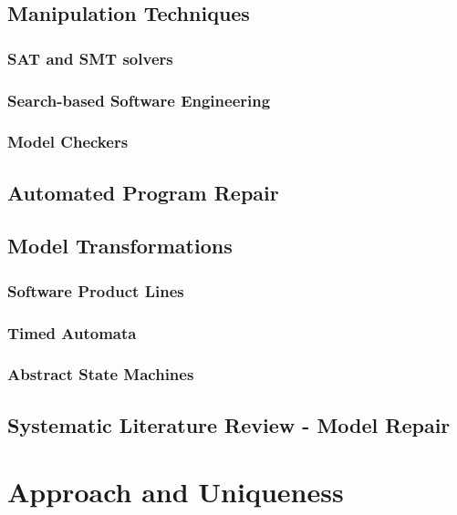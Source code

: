 \documentclass[
11pt, %
oneside, %
english, %
singlespacing, %
headsepline, %
]{MastersDoctoralThesis} %
\theoremstyle{plain}
\theoremstyle{definition}
\theoremstyle{remark}
\theoremstyle{remark}
\theoremstyle{plain}
\theoremstyle{plain}
\begin{document}
\section{Manipulation Techniques}
\subsection{SAT and SMT solvers}
\subsection{Search-based Software Engineering}
\subsection{Model Checkers}

\section{Automated Program Repair}

\section{Model Transformations}
\subsection{Software Product Lines}
\subsection{Timed Automata}
\subsection{Abstract State Machines}

\section{Systematic Literature Review - Model Repair}



\chapter{Approach and Uniqueness}
\end{document}
